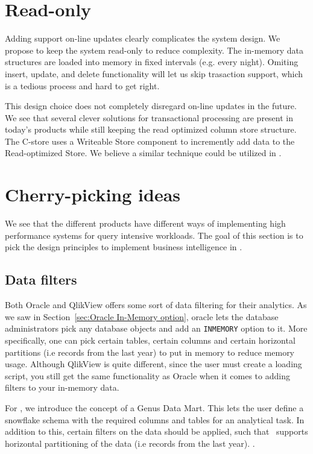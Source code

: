\section{Read-only}
\label{sec:Read-only}
Adding support on-line updates clearly complicates the system design. We propose to keep the system read-only to reduce complexity. The in-memory data structures are loaded into memory in fixed intervals (e.g. every night). Omiting insert, update, and delete functionality will let us skip trasaction support, which is a tedious process and hard to get right.

This design choice does not completely disregard on-line updates in the future. We see that several clever solutions for transactional processing are present in today's products while still keeping the read optimized column store structure. The C-store uses a Writeable Store component to incremently add data to the Read-optimized Store. We believe a similar technique could be utilized in \projectName.


\section{Cherry-picking ideas}
\label{sec:Cherry-picking ideas}
We see that the different products have different ways of implementing high performance systems for query intensive workloads. The goal of this section is to pick the design principles to implement business intelligence in \genusSoftware.

\subsection{Data filters}
\label{sub:Data filters}
Both Oracle and QlikView offers some sort of data filtering for their analytics. As we saw in Section~\ref{sec:Oracle In-Memory option}, oracle lets the database administrators pick any database objects and add an \texttt{INMEMORY} option to it. More specifically, one can pick certain tables, certain columns and certain horizontal partitions (i.e records from the last year) to put in memory to reduce memory usage. Although QlikView is quite different, since the user must create a loading script, you still get the same functionality as Oracle when it comes to adding filters to your in-memory data.

For \genusSoftware, we introduce the concept of a Genus Data Mart. This lets the user define a snowflake schema with the required columns and tables for an analytical task. In addition to this, certain filters on the data should be applied, such that \projectName~supports horizontal partitioning of the data (i.e records from the last year). .

